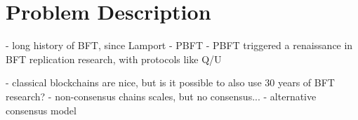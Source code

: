 \chapter{Problem Description}
\label{ch:problem}

- long history of BFT, since Lamport
- PBFT
- PBFT triggered a renaissance in BFT replication research, with protocols like Q/U

- classical blockchains are nice, but is it possible to also use 30 years of BFT research?
- non-consensus chains scales, but no consensus...
- alternative consensus model




